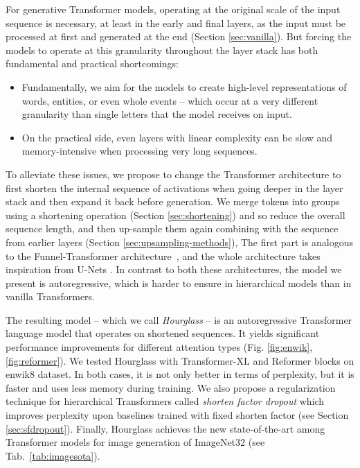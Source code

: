 \documentclass[11pt]{article}
\begin{document}
For generative Transformer models, operating at the original scale of the input sequence is necessary, at least in the early and final layers, as the input must be processed at first and generated at the end (Section \ref{sec:vanilla}). But forcing the models to operate at this granularity throughout the layer stack has both fundamental and practical shortcomings:
\begin{itemize}
    \item Fundamentally, we aim for the models to create high-level
      representations of words, entities, or even whole events -- which
      occur at a very different granularity than single letters that
      the model receives on input.
    \item On the practical side, even layers with linear complexity
      can be slow and memory-intensive when processing very long sequences.
\end{itemize}
To alleviate these issues, we propose to change the Transformer architecture to first shorten the internal sequence of activations when going deeper in the layer stack and then expand it back before generation. We merge tokens into groups using a shortening operation (Section \ref{sec:shortening}) and so reduce the overall sequence length, and then up-sample them again combining with the sequence from earlier layers (Section \ref{sec:upsampling-methods}), The first part is analogous to the Funnel-Transformer architecture~\cite{dai2020funneltransformer}, and the whole architecture takes inspiration from U-Nets \cite{ronneberger2015unet}. In contrast to both these architectures, the model we present is autoregressive, which is harder to ensure in hierarchical models than in vanilla Transformers.

The resulting model -- which we call \emph{Hourglass} -- is an autoregressive Transformer language model that operates on shortened sequences. It yields significant performance improvements for different attention types (Fig. \ref{fig:enwik},\ref{fig:reformer}). We tested Hourglass with Transformer-XL \cite{dai2019transformerxl} and Reformer \cite{kitaev2020reformer} blocks on enwik8 dataset. In both cases, it is not only better in terms of perplexity, but it is faster and uses less memory during training. We also propose a regularization technique for hierarchical Transformers called \emph{shorten factor dropout} which improves perplexity upon baselines trained with fixed shorten factor (see Section \ref{sec:sfdropout}). Finally, Hourglass achieves the new state-of-the-art among Transformer models for image generation of ImageNet32 (see Tab.~\ref{tab:imagesota}).
\end{document}
